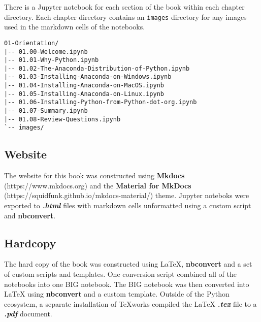 \documentclass{book}
\newcommand{\passthrough}[1]{#1}
\begin{document}
There is a Jupyter notebook for each section of the book within each
chapter directory. Each chapter directory contains an
\passthrough{\lstinline!images!} directory for any images used in the
markdown cells of the notebooks.

\begin{lstlisting}
01-Orientation/
|-- 01.00-Welcome.ipynb
|-- 01.01-Why-Python.ipynb
|-- 01.02-The-Anaconda-Distribution-of-Python.ipynb
|-- 01.03-Installing-Anaconda-on-Windows.ipynb
|-- 01.04-Installing-Anaconda-on-MacOS.ipynb
|-- 01.05-Installing-Anaconda-on-Linux.ipynb
|-- 01.06-Installing-Python-from-Python-dot-org.ipynb
|-- 01.07-Summary.ipynb
|-- 01.08-Review-Questions.ipynb
`-- images/
\end{lstlisting}
    




    
        \hypertarget{website}{%
\subsection{Website}\label{website}}
    




    
        The website for this book was constructed using \textbf{Mkdocs}
(https://www.mkdocs.org) and the \textbf{Material for MkDocs}
(https://squidfunk.github.io/mkdocs-material/) theme. Jupyter noteboks
were exported to \textbf{\emph{.html}} files with markdown cells
unformatted using a custom script and \textbf{nbconvert}.
    




    
        \hypertarget{hardcopy}{%
\subsection{Hardcopy}\label{hardcopy}}
    




    
        The hard copy of the book was constructed using LaTeX,
\textbf{nbconvert} and a set of custom scripts and templates. One
conversion script combined all of the notebooks into one BIG notebook.
The BIG notebook was then converted into LaTeX using \textbf{nbconvert}
and a custom template. Outside of the Python ecosystem, a separate
installation of TeXworks compiled the LaTeX \textbf{\emph{.tex}} file to
a \textbf{\emph{.pdf}} document.
    
\end{document}
